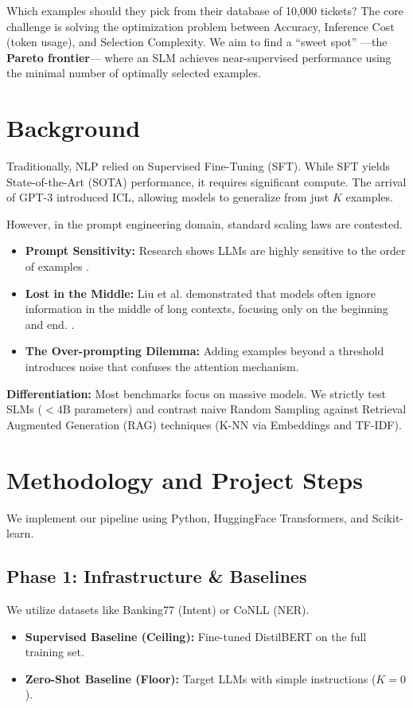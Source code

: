 \documentclass{article}
\begin{document}
Which examples should they pick from their database of 10,000 tickets? The core challenge is solving the optimization problem between Accuracy, Inference Cost (token usage), and Selection Complexity. We aim to find a ``sweet spot'' ---the \textbf{Pareto frontier}--- where an SLM achieves near-supervised performance using the minimal number of optimally selected examples.

\section{Background}
Traditionally, NLP relied on Supervised Fine-Tuning (SFT). While SFT yields State-of-the-Art (SOTA) performance, it requires significant compute. The arrival of GPT-3 introduced ICL, allowing models to generalize from just $K$ examples.

However, in the prompt engineering domain, standard scaling laws are contested.
\begin{itemize}
    \item \textbf{Prompt Sensitivity:} Research shows LLMs are highly sensitive to the order of examples \citep{order2025}.
    \item \textbf{Lost in the Middle:} Liu et al. demonstrated that models often ignore information in the middle of long contexts, focusing only on the beginning and end. \citep{lostInTheMiddle2023}.
    \item \textbf{The Over-prompting Dilemma:} Adding examples beyond a threshold introduces noise that confuses the attention mechanism.\citep{fewshot2025}
\end{itemize}

\textbf{Differentiation:} Most benchmarks focus on massive models. We strictly test SLMs ($<4$B parameters) and contrast naive Random Sampling against Retrieval Augmented Generation (RAG) techniques (K-NN via Embeddings and TF-IDF).

\section{Methodology and Project Steps}
We implement our pipeline using Python, HuggingFace Transformers, and Scikit-learn.

\subsection{Phase 1: Infrastructure \& Baselines}
We utilize datasets like Banking77 (Intent) or CoNLL (NER).
\begin{itemize}
    \item \textbf{Supervised Baseline (Ceiling):} Fine-tuned DistilBERT on the full training set.
    \item \textbf{Zero-Shot Baseline (Floor):} Target LLMs with simple instructions ($K=0$).
\end{itemize}
\end{document}
